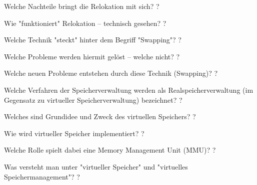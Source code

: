 \documentclass[avery5371]{flashcards}
\begin{document}
\begin{flashcard}[Speichermanagement]{Welche Nachteile bringt die Relokation mit sich?}
    ?
\end{flashcard}

\begin{flashcard}[Speichermanagement]{Wie "funktioniert" Relokation – technisch gesehen? }
    ?
\end{flashcard}

\begin{flashcard}[Speichermanagement]{Welche Technik "steckt" hinter dem Begriff "Swapping"? }
    ?
\end{flashcard}

\begin{flashcard}[Speichermanagement]{Welche Probleme werden hiermit gelöst – welche nicht? }
    ?
\end{flashcard}

\begin{flashcard}[Speichermanagement]{Welche neuen Probleme entstehen durch diese Technik (Swapping)?}
    ?
\end{flashcard}

\begin{flashcard}[Speichermanagement]{Welche Verfahren der Speicherverwaltung werden als Realspeicherverwaltung (im Gegensatz zu virtueller Speicherverwaltung) bezeichnet?}
    ?
\end{flashcard}

\begin{flashcard}[Speichermanagement]{Welches sind Grundidee und Zweck des virtuellen Speichers? }
    ?
\end{flashcard}

\begin{flashcard}[Speichermanagement]{Wie wird virtueller Speicher implementiert? }
    ?
\end{flashcard}

\begin{flashcard}[Speichermanagement]{Welche Rolle spielt dabei eine Memory Management Unit (MMU)? }
    ?
\end{flashcard}

\begin{flashcard}[Speichermanagement]{Was versteht man unter "virtueller Speicher" und "virtuelles Speichermanagement"? }
    ?
\end{flashcard}
\end{document}
